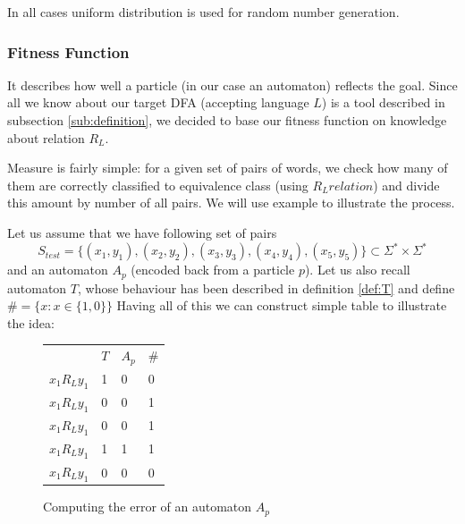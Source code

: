 \documentclass{article}
\begin{document}
In all cases uniform distribution is used for random number generation.

\subsubsection{Fitness Function}\label{sec:fitness}
It describes how well a particle (in our case an automaton) reflects the goal. Since all we know about our target DFA (accepting language $L$) is a tool described in subsection \ref{sub:definition}, we decided to base our fitness function on knowledge about relation $R_{L}$. 

Measure is fairly simple: for a given set of pairs of words, we check how many of them are correctly classified to equivalence class (using $R_{L} relation$) and divide this amount by number of all pairs. We will use example to illustrate the process.



Let us assume that we have following set of pairs
\[
S_{test} = \{(x_1,y_1), (x_2,y_2), (x_3, y_3), (x_4, y_4), (x_5, y_5)\} \subset \Sigma^{*}\times\Sigma^{*} 
\]
and an automaton $A_p$ (encoded back from a particle $p$).
Let us also recall automaton $T$, whose behaviour has been described in definition \ref{def:T} and define $\# = \{ x : x \in \{1 ,0 \}\}$  Having all of this we can construct simple table to illustrate the idea:

\begin{figure}[H]
\begin{center}
\begin{tabular}{ m{4.5em}  m{3em}  m{3em}  m{3em} }
                 & $T$ & $A_p$ & $\#$ \\  
 $x_1 R_{L} y_1$ & 1 & 0 & 0 \\   
 $x_1 R_{L} y_1$ & 0 & 0 & 1 \\   
 $x_1 R_{L} y_1$ & 0 & 0 & 1 \\   
 $x_1 R_{L} y_1$ & 1 & 1 & 1 \\   
 $x_1 R_{L} y_1$ & 0 & 0 & 0 \\   
\end{tabular}
\caption{Computing the error of an automaton $A_p$}
\label{fig:fitness_table}
\end{center}
\end{figure}
\end{document}
